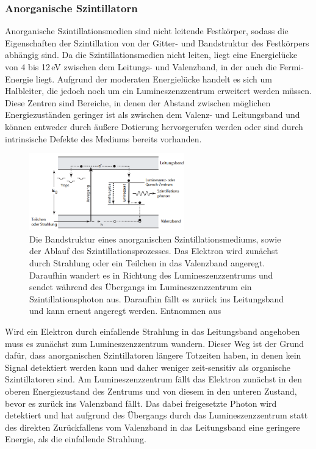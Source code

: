             \subsubsection*{Anorganische Szintillatorn}
                Anorganische Szintillationsmedien sind nicht leitende Festkörper, sodass die Eigenschaften der Szintillation von der Gitter- und Bandstruktur des Festkörpers abhängig sind. Da die 
                Szintillationsmedien nicht leiten, liegt eine Energielücke von 4 bis 12$\,$eV zwischen dem Leitungs- und Valenzband, in der auch die Fermi-Energie liegt. Aufgrund der moderaten Energielücke 
                handelt es sich um Halbleiter, die jedoch noch um ein Lumineszenzzentrum erweitert werden müssen. Diese Zentren sind Bereiche, in denen der Abstand zwischen möglichen Energiezuständen geringer 
                ist als zwischen dem Valenz- und Leitungsband und können entweder durch äußere Dotierung hervorgerufen werden oder sind durch intrinsische Defekte des Mediums bereits vorhanden.
                
                \FloatBarrier

                \begin{figure}[h]
                  \centering
                  \includegraphics[width = 0.6\textwidth]{pictures/Bandstruktur.png}
                  \caption{Die Bandstruktur eines anorganischen Szintillationsmediums, sowie der Ablauf des Szintillationsprozesses. Das Elektron wird zunächst durch Strahlung oder ein Teilchen in das Valenzband angeregt. Daraufhin wandert es in Richtung des Lumineszenzzentrums und sendet während des Übergangs im Lumineszenzzentrum ein Szintillationsphoton aus. Daraufhin fällt es zurück ins Leitungsband und kann erneut angeregt werden. Entnommen aus \cite{kolanoski_teilchendetektoren_2016}}
                  \label{fig:Bandstruktur}
                \end{figure}
        
                \FloatBarrier
        
                \noindent

                Wird ein Elektron durch einfallende Strahlung in das Leitungsband angehoben muss es zunächst zum Lumineszenzzentrum wandern. Dieser Weg ist der Grund dafür, dass anorganischen Szintillatoren
                längere Totzeiten haben, in denen kein Signal detektiert werden kann und daher weniger zeit-sensitiv als organische Szintillatoren sind. Am Lumineszenzzentrum fällt das Elektron zunächst in den 
                oberen Energiezustand des Zentrums und von diesem in den unteren Zustand, bevor es zurück ins Valenzband fällt. Das dabei freigesetzte Photon wird detektiert und hat aufgrund des Übergangs 
                durch das Lumineszenzzentrum statt des direkten Zurückfallens vom Valenzband in das Leitungsband eine geringere Energie, als die einfallende Strahlung.


